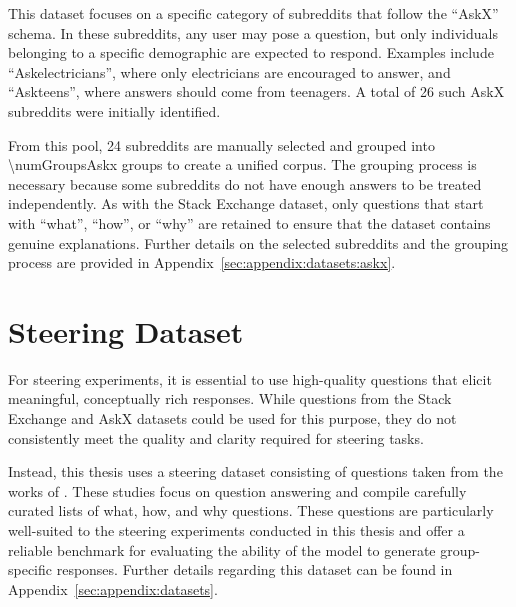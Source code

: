 This dataset focuses on a specific category of subreddits that follow the \enquote{AskX} schema. In these subreddits, any user may pose a question, but only individuals belonging to a specific demographic are expected to respond. Examples include \enquote{Askelectricians}, where only electricians are encouraged to answer, and \enquote{Askteens}, where answers should come from teenagers. A total of \num{26} such AskX subreddits were initially identified.

From this pool, \num{24} subreddits are manually selected and grouped into \num{\numGroupsAskx} groups to create a unified corpus. The grouping process is necessary because some subreddits do not have enough answers to be treated independently. As with the Stack Exchange dataset, only questions that start with \enquote{what}, \enquote{how}, or \enquote{why} are retained to ensure that the dataset contains genuine explanations. Further details on the selected subreddits and the grouping process are provided in Appendix~\ref{sec:appendix:datasets:askx}.

\section{Steering Dataset}%
\label{sec:datasets:steering}
For steering experiments, it is essential to use high-quality questions that elicit meaningful, conceptually rich responses. While questions from the Stack Exchange and AskX datasets could be used for this purpose, they do not consistently meet the quality and clarity required for steering tasks.

Instead, this thesis uses a steering dataset consisting of questions taken from the works of \citet{petroni-etal-2021-kilt,rooeinKnowYourAudience2023}. These studies focus on question answering and compile carefully curated lists of what, how, and why questions. These questions are particularly well-suited to the steering experiments conducted in this thesis and offer a reliable benchmark for evaluating the ability of the model to generate group-specific responses. Further details regarding this dataset can be found in Appendix~\ref{sec:appendix:datasets}.

